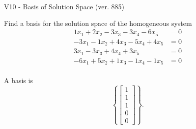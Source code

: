 \begin{exercise}
  \begin{exerciseTitle}V10 - Basis of Solution Space (ver. 885)\end{exerciseTitle}
  \begin{exerciseStatement}
    Find a basis for the solution space of the homogeneous system 
\begin{align*}
 1 x_ 1 + 2 x_ 2 -3 x_ 3 -3 x_ 4 -6 x_ 5 &= 0  \\ 
  -3 x_ 1 -1 x_ 2 + 4 x_ 3 -5 x_ 4 + 4 x_ 5 &= 0  \\ 
  3 x_ 1 -3 x_ 3 + 4 x_ 4 + 3 x_ 5 &= 0  \\ 
  -6 x_ 1 + 5 x_ 2 + 1 x_ 3 -1 x_ 4 -1 x_ 5 &= 0  \\ 
 \end{align*}


 
  \end{exerciseStatement}

  \begin{exerciseAnswer}
   A basis is   
\[\left\{\left[\begin{array}{c}
1 \\
1 \\
1 \\
0 \\
0
\end{array}\right]\right\}.\]

  


  \end{exerciseAnswer}
\end{exercise}